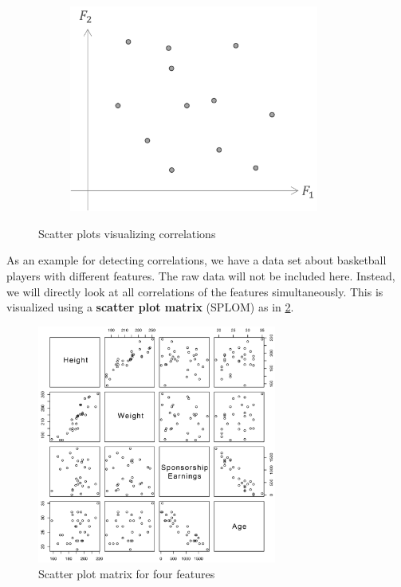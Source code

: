 \begin{figure}[H]
  \begin{subfigure}{0.3\textwidth}
    \centering
    \includegraphics[width=0.9\textwidth]{assets/visualization_and_extraction/feature_relation/scatter_not_cor.png}
  \end{subfigure}
  \caption{Scatter plots visualizing correlations}
  \label{fig:2_correlation}
\end{figure}

As an example for detecting correlations, we have a data set about basketball players with different features. The raw data will not be included here. Instead, we will directly look at all correlations of the features simultaneously. This is visualized using a \textbf{scatter plot matrix} (SPLOM) as in \ref{fig:2_splom}.

\begin{figure}[h]
  \centering
  \includegraphics[width=0.7\textwidth]{assets/visualization_and_extraction/feature_relation/splom.png}
  \caption{Scatter plot matrix for four features}
  \label{fig:2_splom}
\end{figure}

